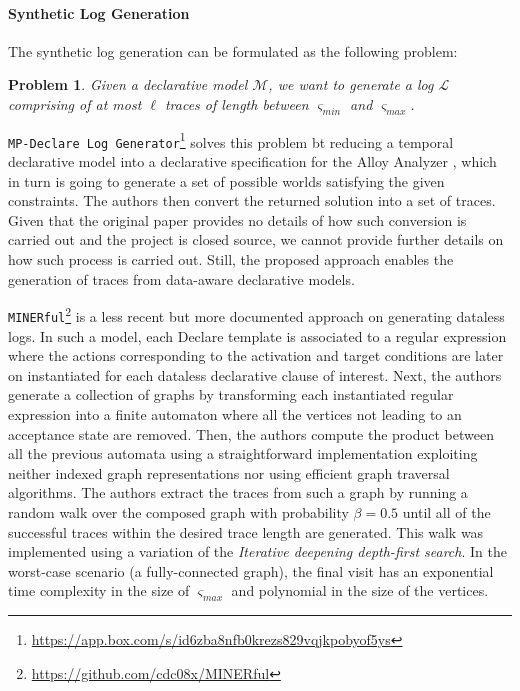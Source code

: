 \documentclass[sigconf]{acmart}
\newtheorem{problem}{Problem}
\newcommand{\smin}{\ensuremath{\varsigma_\textit{min}}}
\newcommand{\smax}{\ensuremath{\varsigma_\textit{max}}}
\begin{document}
\paragraph*{Synthetic Log Generation} The synthetic log generation can be formulated as the following problem: 

\begin{problem}\label{problem}
Given a declarative model $\mathcal{M}$, we want to generate a log $\mathcal{L}$ comprising of at most $\ell$ traces of length between $\smin$ and $\smax$.
\end{problem}

\texttt{MP-Declare Log Generator}\footnote{\url{https://app.box.com/s/id6zba8nfb0krezs829vqjkpobyof5ys}} \cite{DBLP:conf/bpm/SkydanienkoFGM18} solves this problem bt reducing a temporal declarative model into a declarative specification for the Alloy Analyzer \cite{DBLP:books/daglib/0024034}, which in turn is going to generate a set of possible worlds satisfying the given constraints. The authors then convert the returned solution into a set of traces. Given that  the original paper provides no details of how such conversion is carried out and the project is closed source, we cannot provide further details on how such process is carried out. Still, the proposed approach enables the generation of traces from data-aware declarative models.

\texttt{MINERful}\footnote{\url{https://github.com/cdc08x/MINERful}} \cite{DBLP:conf/caise/CiccioBCM15} is a less recent but more documented approach on generating dataless logs. In such a model, each Declare template is associated to a regular expression where the actions corresponding to the activation and target conditions are later on instantiated for each dataless declarative clause of interest. Next, the authors generate a collection of graphs by transforming each  instantiated regular expression into a finite automaton where all the vertices not leading to an acceptance state are removed. Then, the authors compute the product between all the previous automata using a straightforward implementation  exploiting neither indexed graph representations nor using efficient graph traversal algorithms. The authors extract the traces from such a graph by running a random walk over the composed graph with probability  $\beta=0.5$ until all of the successful traces within the desired trace length are  generated. This walk was implemented using a variation of the \textit{Iterative deepening depth-first search}. In the worst-case scenario (a fully-connected graph), the final visit has an exponential time complexity in the size of $\varsigma_\textit{max}$ and polynomial in the size of the vertices.
\end{document}

